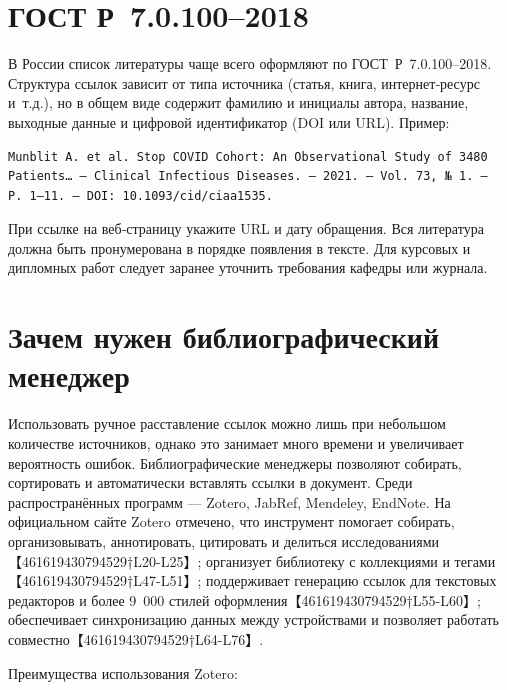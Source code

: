\documentclass[
  russian,
  12pt,
  a4paper,
]{article}
\begin{document}
\chapter{ГОСТ
Р~7.0.100--2018}\label{ux433ux43eux441ux442-ux440-7.0.1002018}

В России список литературы чаще всего оформляют по ГОСТ~Р~7.0.100--2018.
Структура ссылок зависит от типа источника (статья, книга,
интернет‑ресурс и~т.д.), но в общем виде содержит фамилию и инициалы
автора, название, выходные данные и цифровой идентификатор (DOI или
URL). Пример:

\begin{verbatim}
Munblit A. et al. Stop COVID Cohort: An Observational Study of 3480 Patients… – Clinical Infectious Diseases. – 2021. – Vol. 73, № 1. – P. 1–11. – DOI: 10.1093/cid/ciaa1535.
\end{verbatim}

При ссылке на веб‑страницу укажите URL и дату обращения. Вся литература
должна быть пронумерована в порядке появления в тексте. Для курсовых и
дипломных работ следует заранее уточнить требования кафедры или журнала.

\chapter{Зачем нужен библиографический
менеджер}\label{ux437ux430ux447ux435ux43c-ux43dux443ux436ux435ux43d-ux431ux438ux431ux43bux438ux43eux433ux440ux430ux444ux438ux447ux435ux441ux43aux438ux439-ux43cux435ux43dux435ux434ux436ux435ux440}

Использовать ручное расставление ссылок можно лишь при небольшом
количестве источников, однако это занимает много времени и увеличивает
вероятность ошибок. Библиографические менеджеры позволяют собирать,
сортировать и автоматически вставлять ссылки в документ. Среди
распространённых программ --- Zotero, JabRef, Mendeley, EndNote. На
официальном сайте Zotero отмечено, что инструмент помогает собирать,
организовывать, аннотировать, цитировать и делиться
исследованиями【461619430794529†L20-L25】; организует библиотеку с
коллекциями и тегами【461619430794529†L47-L51】; поддерживает генерацию
ссылок для текстовых редакторов и более 9~000 стилей
оформления【461619430794529†L55-L60】; обеспечивает синхронизацию данных
между устройствами и позволяет работать
совместно【461619430794529†L64-L76】.

Преимущества использования Zotero:
\end{document}
